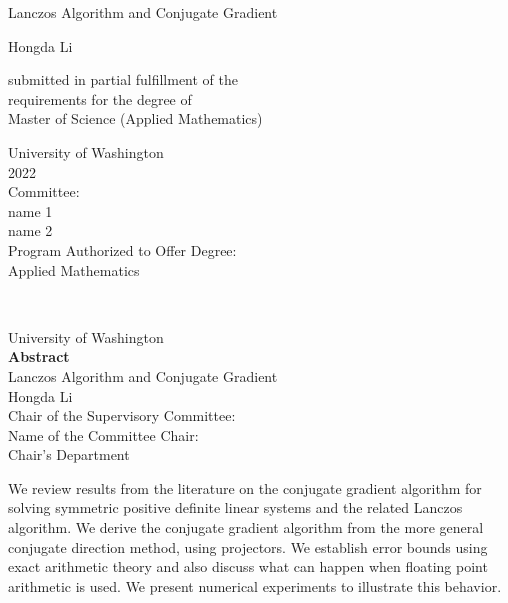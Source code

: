 \documentclass[]{article}
\theoremstyle{definition}
\begin{document}

\begin{center}
    \vspace*{1cm}
    Lanczos Algorithm and Conjugate Gradient
        
    \vspace{1.5cm}

    Hongda Li

    \vspace{0.8cm}
         
    submitted in partial fulfillment of the \\[1em]
    requirements for the degree of\\[1em]
    \vspace{1.5cm}
    Master of Science (Applied Mathematics)
         
    \vspace{0.8cm}
         
    

    University of Washington\\[1em]
    2022\\[1em]
    \vspace{1.5cm}
    Committee:\\[1em]
    name 1\\[1em]
    name 2\\
    \vspace{1.5em}
    Program Authorized to Offer Degree:\\[1em]
    Applied Mathematics
    

\end{center}
\newpage
\ %
\newpage
\begin{center}
    University of Washington\\[1.5cm]
    \textbf{Abstract}\\[1.5cm]
    Lanczos Algorithm and Conjugate Gradient\\[2em]
    Hongda Li\\[2em]
    Chair of the Supervisory Committee:\\[0.5em]
    Name of the Committee Chair: \\[0.5em]
    Chair's Department
    
    
\end{center}
    \begin{spacing}{2}
    We review results from the literature on the conjugate gradient algorithm for solving symmetric positive definite linear systems and the related Lanczos algorithm.  We derive the conjugate gradient algorithm from the more general conjugate direction method, using projectors.  We establish error bounds using exact arithmetic theory and also discuss what can happen when floating point arithmetic is used.  We present numerical experiments to illustrate this behavior.
    \end{spacing}
\newpage
\end{document}
